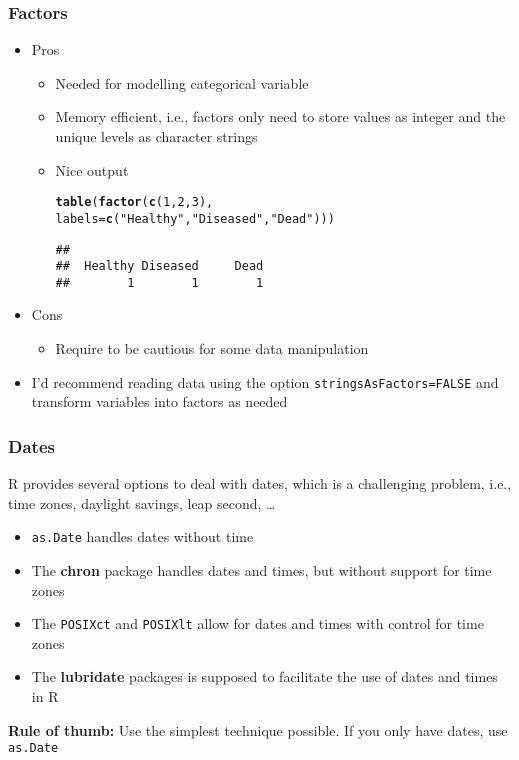 \documentclass[paper=screen,mathserif]{beamer}\usepackage[]{graphicx}\usepackage[]{color}
\makeatletter
\newcommand{\hlnum}[1]{\textcolor[rgb]{0.686,0.059,0.569}{#1}}%
\newcommand{\hlstr}[1]{\textcolor[rgb]{0.192,0.494,0.8}{#1}}%
\newcommand{\hlstd}[1]{\textcolor[rgb]{0.345,0.345,0.345}{#1}}%
\newcommand{\hlkwc}[1]{\textcolor[rgb]{0.333,0.667,0.333}{#1}}%
\newcommand{\hlkwd}[1]{\textcolor[rgb]{0.737,0.353,0.396}{\textbf{#1}}}%
\newenvironment{kframe}{%
 \def\at@end@of@kframe{}%
 \ifinner\ifhmode%
  \def\at@end@of@kframe{\end{minipage}}%
  \begin{minipage}{\columnwidth}%
 \fi\fi%
 \def\FrameCommand##1{\hskip\@totalleftmargin \hskip-\fboxsep
 \colorbox{shadecolor}{##1}\hskip-\fboxsep
     \hskip-\linewidth \hskip-\@totalleftmargin \hskip\columnwidth}%
 \MakeFramed {\advance\hsize-\width
   \@totalleftmargin\z@ \linewidth\hsize
   \@setminipage}}%
 {\par\unskip\endMakeFramed%
 \at@end@of@kframe}
\newenvironment{knitrout}{}{} %
\newcommand{\ft}[1]{\frametitle{#1}}
\makeatother
\begin{document}
\begin{frame}[fragile]
  \ft{Factors}
  \begin{itemize}
  \item Pros
    \begin{itemize}
    \item Needed for modelling categorical variable
    \item Memory efficient, i.e., factors only need to store values as
      integer and the unique levels as character strings
    \item Nice output
\begin{knitrout}\scriptsize
{}\color{fgcolor}\begin{kframe}
\begin{alltt}
\hlkwd{table}\hlstd{(}\hlkwd{factor}\hlstd{(}\hlkwd{c}\hlstd{(}\hlnum{1}\hlstd{,} \hlnum{2}\hlstd{,} \hlnum{3}\hlstd{),}
             \hlkwc{labels} \hlstd{=} \hlkwd{c}\hlstd{(}\hlstr{"Healthy"}\hlstd{,} \hlstr{"Diseased"}\hlstd{,} \hlstr{"Dead"}\hlstd{)))}
\end{alltt}
\begin{verbatim}
## 
##  Healthy Diseased     Dead 
##        1        1        1
\end{verbatim}
\end{kframe}
\end{knitrout}
    \end{itemize}
  \item Cons
    \begin{itemize}
    \item Require to be cautious for some data manipulation
    \end{itemize}
  \item I'd recommend reading data using the option
    \verb|stringsAsFactors=FALSE| and transform variables into factors
    as needed
  \end{itemize}
\end{frame}

\begin{frame}[fragile]
  \ft{Dates}
  
  R provides several options to deal with dates, which is a
  challenging problem, i.e., time zones, daylight savings, leap
  second, \dots
  
  \begin{itemize}
  \item \verb=as.Date= handles dates without time
  \item The {\bf chron} package handles dates and times, but without
    support for time zones
  \item The {\tt POSIXct} and {\tt POSIXlt} allow for dates and times
    with control for time zones
  \item The {\bf lubridate} packages is supposed to facilitate the use
    of dates and times in R
  \end{itemize}
  {\bf Rule of thumb:} Use the simplest technique possible. If you
  only have dates, use {\tt as.Date}
  
\end{frame}
\end{document}

